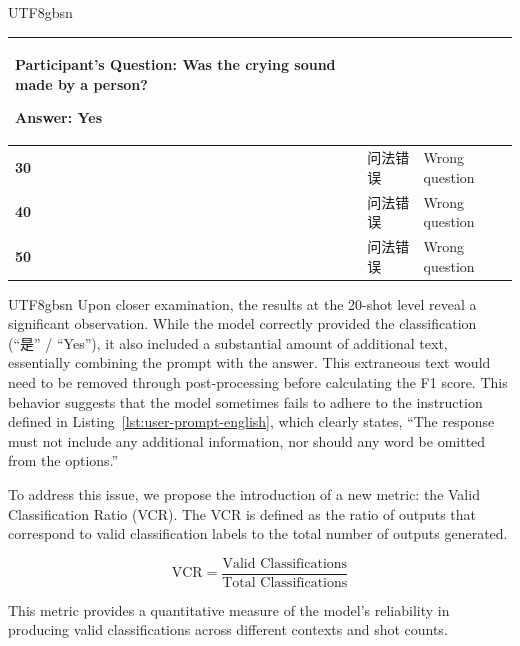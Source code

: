 \begin{table}[h!]
\begin{CJK*}{UTF8}{gbsn}
{\begin{tabular}{|l|p{6.5cm}|p{10cm}|}
Participant’s Question: Was the crying sound made by a person?

Answer: Yes \\ \hline
\textbf{30} & 问法错误 & Wrong question \\ \hline
\textbf{40} & 问法错误 & Wrong question \\ \hline
\textbf{50} & 问法错误 & Wrong question \\ \hline
\end{tabular}
}
\end{CJK*}
\end{table}


\begin{CJK*}{UTF8}{gbsn}
Upon closer examination, the results at the 20-shot level reveal a significant observation. While the model correctly provided the classification (“是” / “Yes”), it also included a substantial amount of additional text, essentially combining the prompt with the answer. This extraneous text would need to be removed through post-processing before calculating the F1 score. This behavior suggests that the model sometimes fails to adhere to the instruction defined in Listing~\ref{lst:user-prompt-english}, which clearly states, “The response must not include any additional information, nor should any word be omitted from the options.”
\end{CJK*}

To address this issue, we propose the introduction of a new metric: the Valid Classification Ratio (VCR). The VCR is defined as the ratio of outputs that correspond to valid classification labels to the total number of outputs generated.

\begin{equation}
\text{VCR} = \frac{\text{Valid Classifications}}{\text{Total Classifications}}
\end{equation}

This metric provides a quantitative measure of the model's reliability in producing valid classifications across different contexts and shot counts.
